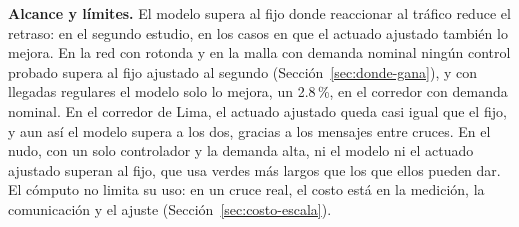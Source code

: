 \noindent\textbf{Alcance y límites.} El modelo supera al fijo donde
reaccionar al tráfico reduce el retraso: en el segundo estudio, en los
casos en que el actuado ajustado también lo mejora. En la red con
rotonda y en la malla con demanda nominal ningún control probado supera
al fijo ajustado al segundo (Sección~\ref{sec:donde-gana}), y con
llegadas regulares el modelo solo lo mejora, un 2.8\,\%, en el corredor
con demanda nominal. En el corredor de Lima, el actuado ajustado queda
casi igual que el fijo, y aun así el modelo supera a los dos, gracias a
los mensajes entre cruces. En el nudo, con un solo controlador y la
demanda alta, ni el modelo ni el actuado ajustado superan al fijo, que
usa verdes más largos que los que ellos pueden dar. El cómputo no
limita su uso: en un cruce real, el costo está en la medición, la
comunicación y el ajuste (Sección~\ref{sec:costo-escala}).

